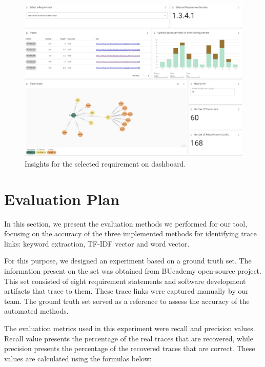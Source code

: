 \documentclass[conference]{IEEEtran}
\begin{document}
\begin{figure}[htb]
    \centering
    \includegraphics[width=0.9\linewidth]{figs/perreq.jpg}
    \caption{Insights for the selected requirement on dashboard.}
    \label{fig:perreq}
\end{figure}


\section{Evaluation Plan}
\label{section:evaluation}


In this section, we present the evaluation methods we performed for our tool, focusing on the accuracy of the three implemented methods for identifying trace links: keyword extraction, TF-IDF vector and word vector.

For this purpose, we designed an experiment based on a ground truth set. The information present on the set was obtained from BUcademy\cite{bounswe-bucademy} open-source project. This set consisted of eight requirement statements and software development artifacts that trace to them. These trace links were captured manually by our team. The ground truth set served as a reference to assess the accuracy of the automated methods. 

The evaluation metrics used in this experiment were recall and precision values. Recall value presents the percentage of the real traces that are recovered, while precision presents the percentage of the recovered traces that are correct. These values are calculated using the formulas below:
\\
\end{document}
